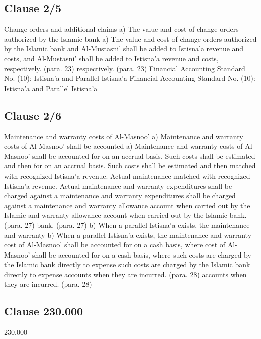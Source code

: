 \documentclass{article}%
\begin{document}
%
\subsection{Clause 2/5}%
\label{subsec:Clause2/5}%
Change orders and additional claims a) The value and cost of change orders authorized by the Islamic bank  a) The value and cost of change orders authorized by the Islamic bank  and Al-Mustasni’ shall be added to Istisna’a revenue and costs,  and Al-Mustasni’ shall be added to Istisna’a revenue and costs,  respectively. (para. 23) respectively. (para. 23) Financial Accounting Standard No. (10): Istisna’a and Parallel Istisna’a Financial Accounting Standard No. (10): Istisna’a and Parallel Istisna’a

%
\subsection{Clause 2/6}%
\label{subsec:Clause2/6}%
Maintenance and warranty costs of Al-Masnoo’ a) Maintenance and warranty costs of Al-Masnoo’ shall be accounted  a) Maintenance and warranty costs of Al-Masnoo’ shall be accounted  for on an accrual basis. Such costs shall be estimated and then  for on an accrual basis. Such costs shall be estimated and then  matched with recognized Istisna’a revenue. Actual maintenance  matched with recognized Istisna’a revenue. Actual maintenance  and warranty expenditures shall be charged against a maintenance  and warranty expenditures shall be charged against a maintenance  and warranty allowance account when carried out by the Islamic  and warranty allowance account when carried out by the Islamic  bank. (para. 27) bank. (para. 27) b) When a parallel Istisna’a exists, the maintenance and warranty  b) When a parallel Istisna’a exists, the maintenance and warranty  cost of Al-Masnoo’ shall be accounted for on a cash basis, where  cost of Al-Masnoo’ shall be accounted for on a cash basis, where  such costs are charged by the Islamic bank directly to expense  such costs are charged by the Islamic bank directly to expense  accounts when they are incurred. (para. 28) accounts when they are incurred. (para. 28)

%
\subsection{Clause 230.000}%
\label{subsec:Clause230.000}%
230.000

%
\end{document}
